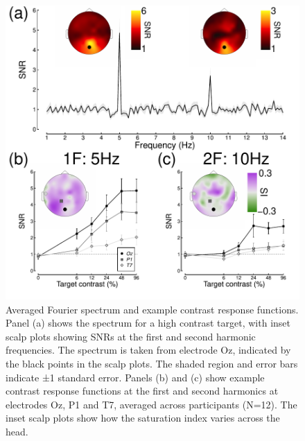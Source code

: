 \documentclass[]{article}
\begin{document}
\begin{figure}

{\centering \includegraphics{figures/fftfig} 

}

\caption{Averaged Fourier spectrum and example contrast response functions. Panel (a) shows the spectrum for a high contrast target, with inset scalp plots showing SNRs at the first and second harmonic frequencies. The spectrum is taken from electrode Oz, indicated by the black points in the scalp plots. The shaded region and error bars indicate ±1 standard error. Panels (b) and (c) show example contrast response functions at the first and second harmonics at electrodes Oz, P1 and T7, averaged across participants (N=12). The inset scalp plots show how the saturation index varies across the head.}\label{fig:fftfig}
\end{figure}
\end{document}
